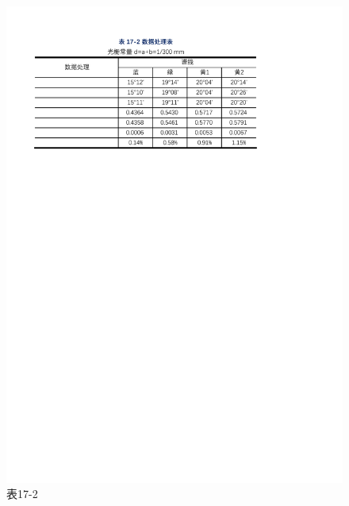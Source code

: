 \documentclass[12pt]{article}
\begin{document}
\begin{figure}[H] %
    \centering
    \includegraphics[width=\textwidth]{./figures/表17-2.pdf} 
    \caption{表17-2}
    \label{fig:table_data2}
\end{figure}
\end{document}
